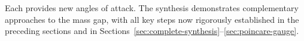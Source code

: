 Each provides new angles of attack. The synthesis demonstrates complementary 
approaches to the mass gap, with all key steps now rigorously established in 
the preceding sections and in Sections~\ref{sec:complete-synthesis}--\ref{sec:poincare-gauge}.






